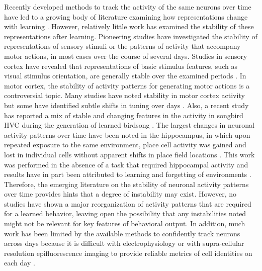 \bigskip

Recently developed methods to track the activity of the same neurons over time have led to a growing body of literature examining how representations change with learning \citep{Huber2012, Komiyama2010, Peters2014, Poort2015}. However, relatively little work has examined the stability of these representations after learning. Pioneering studies have investigated the stability of representations of sensory stimuli or the patterns of activity that accompany motor actions, in most cases over the course of several days. Studies in sensory cortex have revealed that representations of basic stimulus features, such as visual stimulus orientation, are generally stable over the examined periods \citep{Tolias2007, Andermann2010, Mank2008, Margolis2012, Peron2015, Poort2015, Rose2016} . In motor cortex, the stability of activity patterns for generating motor actions is a controversial topic. Many studies have noted stability in motor cortex activity but some have identified subtle shifts in tuning over days \citep{Chestek2007, Ganguly2009, Huber2012, Peters2014, Padoa-Schioppa2004, Rokni2007a, Stevenson2011}. Also, a recent study has reported a mix of stable and changing features in the activity in songbird HVC during the generation of learned birdsong \citep{Liberti2016}. The largest changes in neuronal activity patterns over time have been noted in the hippocampus, in which upon repeated exposure to the same environment, place cell activity was gained and lost in individual cells without apparent shifts in place field locations \citep{Kentros2004, Ziv2013}. This work was performed in the absence of a task that required hippocampal activity and results have in part been attributed to learning and forgetting of environments \citep{Attardo2015, Ziv2013}. Therefore, the emerging literature on the stability of neuronal activity patterns over time provides hints that a degree of instability may exist. However, no studies have shown a major reorganization of activity patterns that are required for a learned behavior, leaving open the possibility that any instabilities noted might not be relevant for key features of behavioral output. In addition, much work has been limited by the available methods to confidently track neurons across days because it is difficult with electrophysiology or with supra-cellular resolution epifluorescence imaging to provide reliable metrics of cell identities on each day \citep{Peron2015a}.
